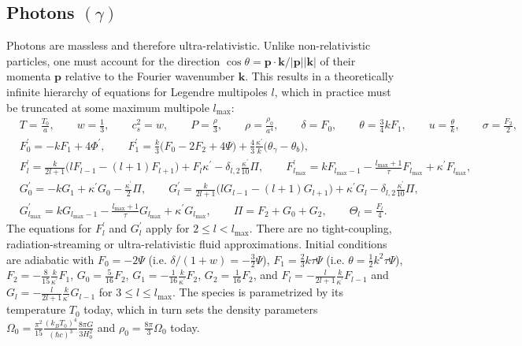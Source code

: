 \documentclass{aa}
\newcommand\lmax{l_\text{max}}
\begin{document}
\subsection{Photons \texorpdfstring{$(\gamma)$}{(γ)}}
\label{sec:photons}
Photons are massless and therefore ultra-relativistic.
Unlike non-relativistic particles, one must account for the direction $\cos\theta = \boldsymbol{p} \cdot \boldsymbol{k} / \lvert\boldsymbol{p}\rvert \lvert\boldsymbol{k}\rvert$ of their momenta $\boldsymbol{p}$ relative to the Fourier wavenumber $\boldsymbol{k}$.
This results in a theoretically infinite hierarchy of equations for Legendre multipoles $l$, which in practice must be truncated at some maximum multipole $\lmax$:
\begin{align*}
&
T = \frac{{T_0}}{a} , \qquad
w = \frac{1}{3} , \qquad
{c_s^2} = w , \qquad
P = \frac{\rho}{3} , \qquad
\rho = \frac{\rho_0}{a^{4}} , \qquad
\delta = F_0 , \qquad
\theta = \frac{3}{4} k F_{1} , \qquad
u = \frac{\theta}{k}, \qquad
\sigma = \frac{F_2}{2} , \\
&
F_0^\prime = - k F_1 + 4 \Phi^\prime , \qquad
F_1^\prime = \frac{k}{3} \big( F_0 - 2 F_2 + 4 \Psi \big) + \frac{4}{3} \frac{\kappa^\prime}{k} \big( \theta_\gamma - {\theta_b} \big), \\
&
F_l^\prime = \frac{k}{2l+1} \big( l F_{l-1} - (l+1) F_{l+1} \big) + F_{l} {\kappa^\prime} - \delta_{l,2}\frac{\kappa^\prime}{10} \Pi , \qquad %
F_{\lmax}^\prime = k F_{\lmax-1} - \frac{\lmax+1}{\tau} F_{\lmax} + {\kappa^\prime} F_{\lmax} , \\
&
G_0^\prime =  - k G_{1} + {\kappa^\prime} {G_0} - \frac{\kappa^\prime}{2} \Pi , \qquad
G_{l}^\prime = \frac{k}{2l+1} \big( l G_{l-1} - (l+1) G_{l+1} \big) + \kappa^\prime G_{l} - \delta_{l,2} \frac{{\kappa^\prime}}{10} \Pi  ,  \\
&
G_{\lmax}^\prime = k G_{\lmax-1} - \frac{\lmax+1}{\tau} G_{\lmax} + {\kappa^\prime} G_{\lmax} , \qquad
\Pi = F_{2} + G_0 + G_{2} , \qquad
{{\Theta}_l} = \frac{F_l}{4} .
\end{align*}
The equations for $F_l^\prime$ and $G_l^\prime$ apply for $2 \leq l < \lmax$.
There are no tight-coupling, radiation-streaming or ultra-relativistic fluid approximations.
Initial conditions are adiabatic with $F_0 = -2\Psi$ (i.e. $\delta/(1+w) = -\frac32 \Psi$), $F_1 = \frac23 k\tau \Psi$ (i.e. $\theta = \frac12 k^2 \tau \Psi$), $F_2 = -\frac{8}{15} \frac{k}{\kappa^\prime} F_1$, $G_0 = \frac{5}{16} F_2$, $G_1 = -\frac{1}{16} \frac{k}{\kappa^\prime} F_2$, $G_2 = \frac{1}{16} F_2$, and $F_l = -\frac{l}{2l+1} \frac{k}{\kappa^\prime} F_{l-1}$ and $G_l = -\frac{l}{2l+1} \frac{k}{\kappa^\prime} G_{l-1}$ for $3 \leq l \leq \lmax$.
The species is parametrized by its temperature $T_0$ today, which in turn sets the density parameters $\Omega_0 = \frac{\pi^2}{15} \frac{(k_B T_0)^4}{(\hbar c)^3} \frac{8\pi G}{3H_0^2}$ and $\rho_0 = \frac{8\pi}{3}\Omega_0$ today.
\end{document}
